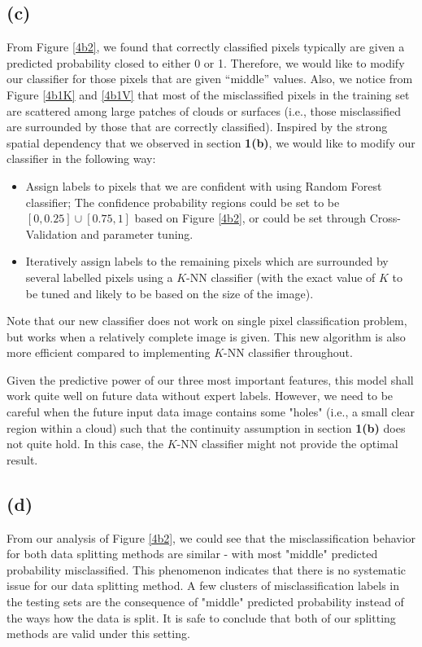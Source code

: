 \documentclass[11pt]{article}
\theoremstyle{definition}
\begin{document}
\subsection*{(c)}
From Figure \ref{4b2}, we found that correctly classified pixels typically are given a predicted probability closed to either 0 or 1. Therefore, we would like to modify our classifier for those pixels that are given ``middle'' values. Also, we notice from Figure \ref{4b1K} and \ref{4b1V} that most of the misclassified pixels in the training set are scattered among large patches of clouds or surfaces (i.e., those misclassified are surrounded by those that are correctly classified). Inspired by the strong spatial dependency that we observed in section \textbf{1(b)}, we would like to modify our classifier in the following way: 

\begin{itemize}
    \item Assign labels to pixels that we are confident with using Random Forest classifier; The confidence probability regions could be set to be $[0, 0.25] \cup [0.75, 1]$ based on Figure \ref{4b2}, or could be set through Cross-Validation and parameter tuning.

    \item Iteratively assign labels to the remaining pixels which are surrounded by several labelled pixels using a $K$-NN classifier (with the exact value of $K$ to be tuned and likely to be based on the size of the image).
\end{itemize}

Note that our new classifier does not work on single pixel classification problem, but works when a relatively complete image is given. This new algorithm is also more efficient compared to implementing $K$-NN classifier throughout. 

Given the predictive power of our three most important features, this model shall work quite well on future data without expert labels. However, we need to be careful when the future input data image contains some "holes" (i.e., a small clear region within a cloud) such that the continuity assumption in section \textbf{1(b)} does not quite hold. In this case, the $K$-NN classifier might not provide the optimal result.

\subsection*{(d)}

From our analysis of Figure \ref{4b2}, we could see that the misclassification behavior for both data splitting methods are similar - with most "middle" predicted probability misclassified. This phenomenon indicates that there is no systematic issue for our data splitting method. A few clusters of misclassification labels in the testing sets are the consequence of "middle" predicted probability instead of the ways how the data is split. It is safe to conclude that both of our splitting methods are valid under this setting.
\end{document}
